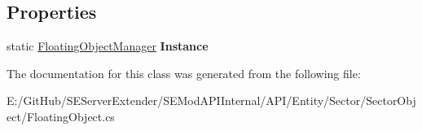 \subsection*{Properties}
\begin{DoxyCompactItemize}
\item 
\hypertarget{class_s_e_mod_a_p_i_internal_1_1_a_p_i_1_1_entity_1_1_sector_1_1_sector_object_1_1_floating_object_manager_a9e7976d0793cdecebe356e899b9e936d}{}static \hyperlink{class_s_e_mod_a_p_i_internal_1_1_a_p_i_1_1_entity_1_1_sector_1_1_sector_object_1_1_floating_object_manager}{Floating\+Object\+Manager} {\bfseries Instance}\label{class_s_e_mod_a_p_i_internal_1_1_a_p_i_1_1_entity_1_1_sector_1_1_sector_object_1_1_floating_object_manager_a9e7976d0793cdecebe356e899b9e936d}

\end{DoxyCompactItemize}


The documentation for this class was generated from the following file\+:\begin{DoxyCompactItemize}
\item 
E\+:/\+Git\+Hub/\+S\+E\+Server\+Extender/\+S\+E\+Mod\+A\+P\+I\+Internal/\+A\+P\+I/\+Entity/\+Sector/\+Sector\+Object/Floating\+Object.\+cs\end{DoxyCompactItemize}
